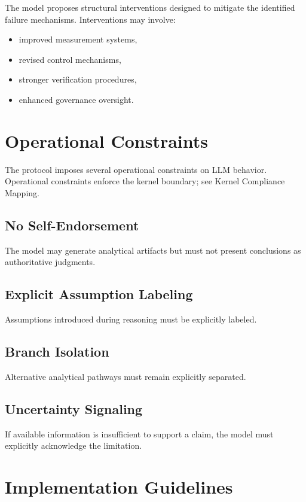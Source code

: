 The model proposes structural interventions designed to mitigate the identified failure mechanisms. Interventions may involve:

\begin{itemize}
\item improved measurement systems,
\item revised control mechanisms,
\item stronger verification procedures,
\item enhanced governance oversight.
\end{itemize}

\section{Operational Constraints}

The protocol imposes several operational constraints on LLM behavior. Operational constraints enforce the kernel boundary; see Kernel Compliance Mapping.

\subsection{No Self-Endorsement}

The model may generate analytical artifacts but must not present conclusions as authoritative judgments.

\subsection{Explicit Assumption Labeling}

Assumptions introduced during reasoning must be explicitly labeled.

\subsection{Branch Isolation}

Alternative analytical pathways must remain explicitly separated.

\subsection{Uncertainty Signaling}

If available information is insufficient to support a claim, the model must explicitly acknowledge the limitation.

\section{Implementation Guidelines}

